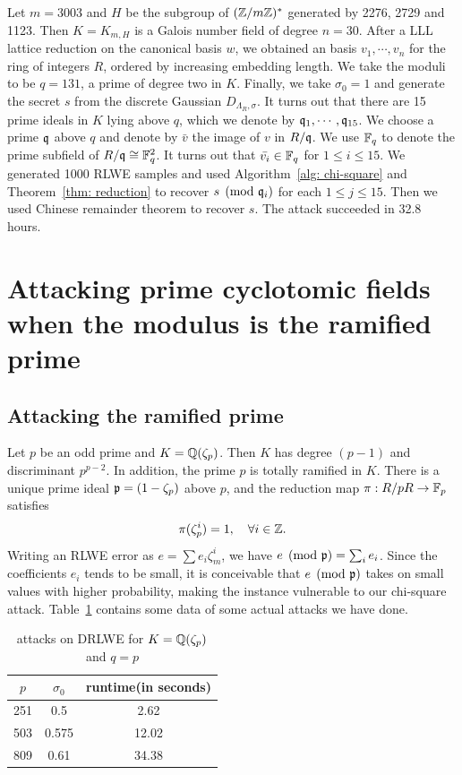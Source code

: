 \documentclass{amsart}
\begin{document}
Let $m = 3003$ and $H$ be the subgroup of $(\mathbb{Z}/m\mathbb{Z})^*$ generated by 2276, 2729 and 1123. Then $K = K_{m,H}$ is a Galois number field of degree $n = 30$. After a LLL lattice reduction on the canonical basis $w$, we obtained an basis $v_1, \cdots, v_n$ for the ring of integers $R$, ordered by increasing embedding length. We take the moduli to be $q = 131$, a prime of degree two in $K$. Finally, we take $\sigma_0 = 1$ and generate the secret $s$ from the discrete Gaussian $D_{\Lambda_R, \sigma}$. It turns out that there are 15 prime ideals in $K$ lying above $q$, which we denote by $\mathfrak{q}_1, \cdots, \mathfrak{q}_{15}$. We choose a prime $\mathfrak{q}$ above $q$ and denote by $\bar{v}$ the image of $v$ in $R/\mathfrak{q}$. We use $\mathbb{F}_q$ to denote the prime subfield of $R/\mathfrak{q} \cong \mathbb{F}_q^2$. It turns out that $\bar{v_i} \in \mathbb{F}_q$ for $1 \leq i \leq 15$. We generated 1000 RLWE samples and used Algorithm~\ref{alg: chi-square} and Theorem~\ref{thm: reduction} to recover $s \pmod {\mathfrak{q}_i}$ for each $1 \leq j \leq 15$. Then we used Chinese remainder theorem to recover $s$. The attack succeeded in 32.8 hours.





\section{Attacking prime cyclotomic fields when the modulus is the ramified prime}
\label{sec: ramified-prime}

\subsection{Attacking the ramified prime} Let $p$ be an odd prime and $K = \mathbb{Q}(\zeta_p)$. Then $K$ has degree $(p-1)$ and discriminant $p^{p-2}$.
In addition, the prime $p$ is totally ramified in $K$. There is a unique prime ideal $\mathfrak{p} = (1 - \zeta_p)$ above $p$, and the reduction map  $\pi: R/pR \to \mathbb{F}_p$ satisfies
\[
        \pi(\zeta_p^i) = 1, \quad \forall i \in \mathbb{Z}.
\]
Writing an RLWE error as  $e = \sum e_i \zeta_m^i$, we have $e \pmod{\mathfrak{p}} = \sum_i e_i$. Since the coefficients $e_i$ tends to be small, it is conceivable that  $e \pmod{\mathfrak{p}}$ takes on small values with higher probability, making the instance vulnerable to our chi-square attack. Table~\ref{tab: ramified} contains some data of some actual attacks we have done.

\begin{table}[H]
\label{tab: ramified}
\caption{attacks on DRLWE for $K= \mathbb{Q}(\zeta_p)$ and $q = p$}
\begin{tabular}{c|c|c}
$p$ & $\sigma_0$ & runtime(in seconds) \\
\hline
251 & 0.5 & 2.62\\
503 & 0.575 & 12.02\\
809 & 0.61 & 34.38\\
\end{tabular}
\end{table}
\end{document}
